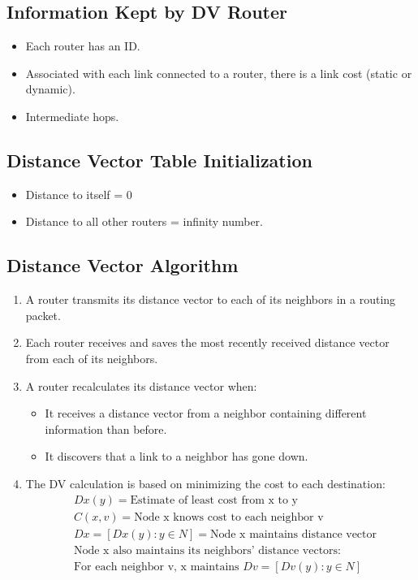 \documentclass{korigamik}
\begin{document}
\subsection{Information Kept by DV Router}
\begin{itemize}
	\item Each router has an ID.
	\item Associated with each link connected to a router, there is a link cost
	      (static or dynamic).
	\item Intermediate hops.
\end{itemize}

\subsection{Distance Vector Table Initialization}
\begin{itemize}
	\item Distance to itself = 0
	\item Distance to all other routers = infinity number.
\end{itemize}

\subsection{Distance Vector Algorithm}
\begin{enumerate}
	\item A router transmits its distance vector to each of its neighbors in a
	      routing packet.
	\item Each router receives and saves the most recently received distance
	      vector from each of its neighbors.
	\item A router recalculates its distance vector when:
	      \begin{itemize}
		      \item It receives a distance vector from a neighbor containing
		            different information than before.
		      \item It discovers that a link to a neighbor has gone down.
	      \end{itemize}
	\item The DV calculation is based on minimizing the cost to each destination:
	      \begin{align*}
		       & Dx(y) = \text{Estimate of least cost from x to y}               \\
		       & C(x,v) = \text{Node x knows cost to each neighbor v}            \\
		       & Dx = [Dx(y): y \in N] = \text{Node x maintains distance vector} \\
		       & \text{Node x also maintains its neighbors' distance vectors:}   \\
		       & \text{For each neighbor v, x maintains } Dv = [Dv(y): y \in N]
	      \end{align*}
\end{enumerate}
\pagebreak
\fi
\end{document}
